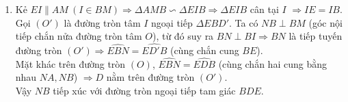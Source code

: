 \begin{bt}
{\begin{enumerate}
Xét các tam giác $\Delta NBE$ và $\Delta NDB$ có góc $N$ chung, $\widehat{NBE}=\widehat{NDB}$ (cùng chắn hai cung bằng nhau là cung $NA, NB$).\\
Suy ra $\Delta NBE\backsim \Delta NDB$, do đó $\dfrac{NB}{ND}=\dfrac{NE}{NB}\Rightarrow NB^2=NE.ND$.\\
Ta có cung $NA$ bằng cung $NB$ (tính chất đường kính và dây cung), suy ra $\widehat{ADE}=\widehat{EDB} \Rightarrow DE$ là phân giác trong của $\Delta ABD$.\\
Vì $ED\perp DC \Rightarrow DC$ là phân giác ngoài của $\Delta ABD$.\\
Từ đó suy ra: $\dfrac{DA}{DB}=\dfrac{EA}{EB}=\dfrac{CA}{CB}\Rightarrow AC.BE=BC.AE$.
    \item Kẻ $EI \| AM \ (I\in BM) \Rightarrow \Delta AMB \backsim \Delta EIB \Rightarrow \Delta EIB$ cân tại $I$ $\Rightarrow IE = IB$.\\
Gọi $(O')$ là đường tròn tâm $I$ ngoại tiếp $\Delta EBD'$. Ta có $NB\perp BM$ (góc nội tiếp chắn nửa đường tròn tâm $O$), từ đó suy ra $BN\perp BI \Rightarrow BN$ là tiếp tuyến đường tròn $(O') \Rightarrow\widehat{EBN}=\widehat{ED'B}$ (cùng chắn cung $BE$).\\
Mặt khác trên đường tròn $(O)$, $\widehat{EBN}=\widehat{EDB}$ (cùng chắn hai cung bằng nhau $NA, NB$) $\Rightarrow D$ nằm trên đường tròn $(O')$.\\
Vậy $NB$ tiếp xúc với đường tròn ngoại tiếp tam giác $BDE$.
\end{enumerate}
}
\end{bt}


